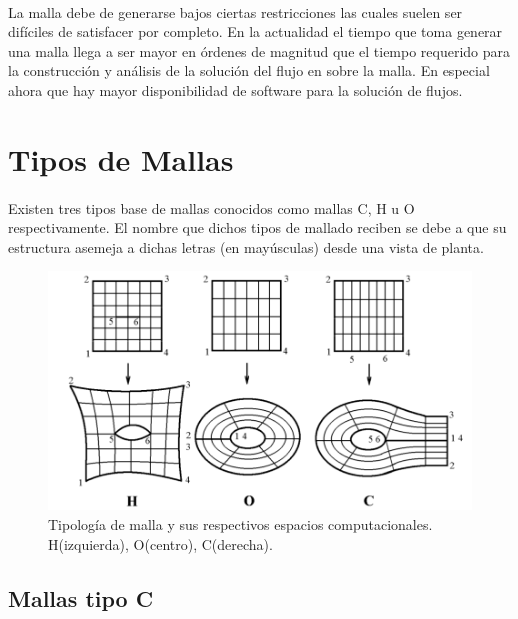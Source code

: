\documentclass[letterpaper, openright, 12pt]{book}
\begin{document}
	
	\paragraph*{}
		La malla debe de generarse bajos ciertas restricciones las cuales suelen ser difíciles de satisfacer por completo. En la actualidad el tiempo que toma generar una malla llega a ser mayor en órdenes de magnitud que el tiempo requerido para la construcción y análisis de la solución del flujo en sobre la malla. En especial ahora que hay mayor disponibilidad de software para la solución de flujos.\cite{thompsonhandbook}
	
	
	\section{Tipos de Mallas}
		\paragraph*{}
		Existen tres tipos base de mallas conocidos como mallas C, H u O respectivamente. El nombre que dichos tipos de mallado reciben se debe a que su estructura asemeja a dichas letras (en mayúsculas) desde una vista de planta.
		
		\begin{figure}[htbp!]
			\centering
			\includegraphics[width=170mm]{./Imagenes/tipos-de-malla}
			\captionsetup{justification=centering, margin=2cm}
			\caption[Tipología de mallas]{Tipología de malla y sus respectivos espacios computacionales. H(izquierda), O(centro), C(derecha).\cite{vladimir-grid}}
			\label{fig:tipos-de-malla}
		\end{figure}
		
		\subsection{Mallas tipo C}
\end{document}
